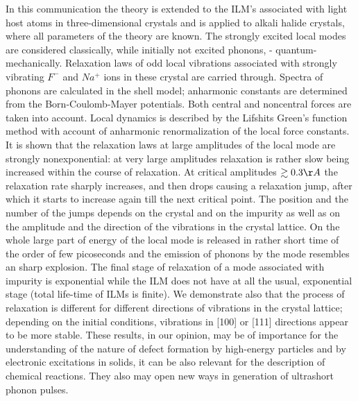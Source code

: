 In this communication the theory \cite{procest,hizhrev,hizhnev} is extended to
the ILM's associated with light host atoms in three-dimensional crystals and 
is applied to alkali halide crystals, where 
all parameters of the theory are known. The strongly excited local modes are 
considered classically, while initially not excited phonons, -
quantum-mechanically. Relaxation laws of odd local vibrations associated with  
strongly vibrating $F^-$ and $Na^+$ ions in these crystal are 
carried through. Spectra of phonons are calculated in the shell model; 
anharmonic constants are determined from the Born-Coulomb-Mayer potentials. 
Both central and noncentral forces are taken into account. Local dynamics is 
described by the Lifshits Green's function method with account of anharmonic 
renormalization of the local force constants. It is shown that the relaxation 
laws at large amplitudes of the local mode are strongly nonexponential: at 
very large amplitudes relaxation is rather slow being increased within the
course of relaxation. At critical amplitudes $\gtrsim 0.3 \AA$ the 
relaxation rate sharply increases, and then drops causing a relaxation jump, 
after which it starts to increase again till the next critical point. The 
position and the number of the jumps depends on the crystal and on the 
impurity as well as on the amplitude and the direction of the vibrations in 
the crystal lattice. On the whole large part of energy of the local mode is 
released in rather short time of the order of few picoseconds 
and the emission of phonons by the mode resembles an sharp 
explosion. The final  stage of relaxation of a mode associated with
impurity is exponential while the ILM does not have at all the usual,
exponential stage (total life-time of ILMs is finite). We 
demonstrate also that the process of relaxation is different for different 
directions of vibrations in the crystal lattice; depending on 
the initial conditions, vibrations in [100] or [111] directions appear to be 
more stable. These results, in our opinion, may be of importance for the 
understanding of the nature of defect formation by high-energy particles and 
by electronic excitations in solids, it can be also relevant for the 
description of chemical reactions. They also may open new ways in 
generation of ultrashort phonon  pulses.


